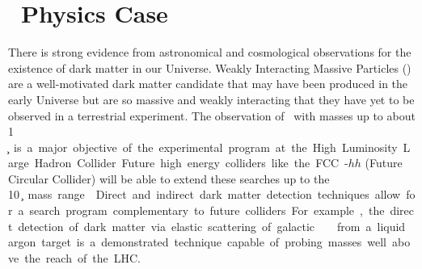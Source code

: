 \section{\DSks\ Physics Case}
\label{sec:PhysicsCase}



\vspace{1cm}

There is strong evidence from astronomical and cosmological observations for the existence of dark matter in our Universe. Weakly Interacting Massive Particles (\WIMPs) are a well-motivated dark matter candidate that may have been produced in the early Universe but are so massive and weakly interacting that they have yet to be observed in a terrestrial experiment. The observation of \WIMPs\ with masses up to about 1 \si{\TeV\per\square\c} is a major objective of the experimental program at the High Luminosity Large Hadron Collider. Future high energy colliders like the FCC-$hh$ (Future Circular Collider) will be able to extend these searches up to the  \SI{10}{\TeV\per\square\c} mass range~\cite{CERN:2017cq}. Direct and indirect dark matter detection techniques allow for a search program complementary to future colliders. For example, the direct detection of dark matter via elastic scattering of galactic \WIMPs\ from a liquid argon target is a demonstrated technique capable of probing masses well above the reach of the LHC.

